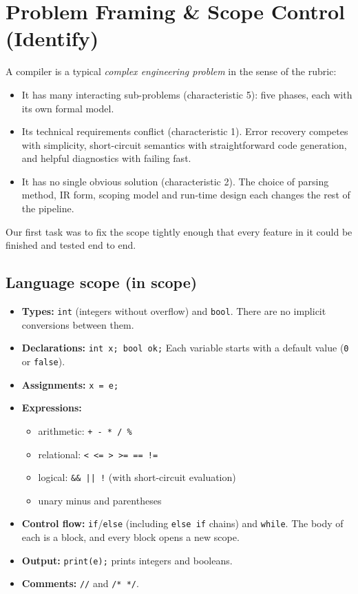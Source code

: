 \documentclass[11pt,letterpaper]{article}
\newcommand{\code}[1]{\texttt{#1}}
\begin{document}
\section{Problem Framing \& Scope Control \textmd{(Identify)}}

A compiler is a typical \emph{complex engineering problem} in the sense of the rubric:
\begin{itemize}
  \item It has many interacting sub-problems (characteristic 5): five phases, each with its own formal model.
  \item Its technical requirements conflict (characteristic 1). Error recovery competes with simplicity, short-circuit semantics with straightforward code generation, and helpful diagnostics with failing fast.
  \item It has no single obvious solution (characteristic 2). The choice of parsing method, IR form, scoping model and run-time design each changes the rest of the pipeline.
\end{itemize}
Our first task was to fix the scope tightly enough that every feature in it could be finished and tested end to end.

\subsection{Language scope (in scope)}
\begin{itemize}
  \item \textbf{Types:} \code{int} (integers without overflow) and \code{bool}. There are no implicit conversions between them.
  \item \textbf{Declarations:} \code{int x; bool ok;} Each variable starts with a default value (\code{0} or \code{false}).
  \item \textbf{Assignments:} \code{x = e;}
  \item \textbf{Expressions:}
  \begin{itemize}
    \item arithmetic: \code{+ - * / \%}
    \item relational: \code{< <= > >= == !=}
    \item logical: \code{\&\& || !} (with short-circuit evaluation)
    \item unary minus and parentheses
  \end{itemize}
  \item \textbf{Control flow:} \code{if}/\code{else} (including \code{else if} chains) and \code{while}. The body of each is a block, and every block opens a new scope.
  \item \textbf{Output:} \code{print(e);} prints integers and booleans.
  \item \textbf{Comments:} \code{//} and \code{/* */}.
\end{itemize}
\end{document}
